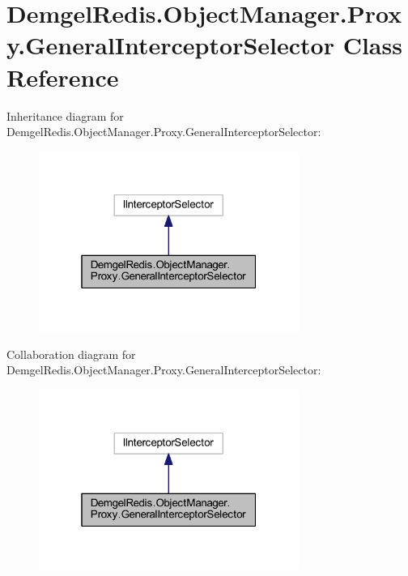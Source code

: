 \hypertarget{class_demgel_redis_1_1_object_manager_1_1_proxy_1_1_general_interceptor_selector}{}\section{Demgel\+Redis.\+Object\+Manager.\+Proxy.\+General\+Interceptor\+Selector Class Reference}
\label{class_demgel_redis_1_1_object_manager_1_1_proxy_1_1_general_interceptor_selector}


Inheritance diagram for Demgel\+Redis.\+Object\+Manager.\+Proxy.\+General\+Interceptor\+Selector\+:
\nopagebreak
\begin{figure}[H]
\begin{center}
\leavevmode
\includegraphics[width=241pt]{class_demgel_redis_1_1_object_manager_1_1_proxy_1_1_general_interceptor_selector__inherit__graph}
\end{center}
\end{figure}


Collaboration diagram for Demgel\+Redis.\+Object\+Manager.\+Proxy.\+General\+Interceptor\+Selector\+:
\nopagebreak
\begin{figure}[H]
\begin{center}
\leavevmode
\includegraphics[width=241pt]{class_demgel_redis_1_1_object_manager_1_1_proxy_1_1_general_interceptor_selector__coll__graph}
\end{center}
\end{figure}
